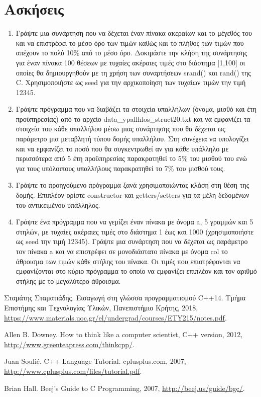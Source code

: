 \section{Ασκήσεις}
\begin{enumerate}
\item Γράψτε μια συνάρτηση που να δέχεται έναν πίνακα ακεραίων και το μέγεθός του και να επιστρέφει το μέσο όρο των τιμών καθώς και το πλήθος των τιμών που απέχουν το πολύ 10\% από το μέσο όρο. Δοκιμάστε την κλήση της συνάρτησης για έναν πίνακα 100 θέσεων με τυχαίες ακέραιες τιμές στο διάστημα [1,100] οι οποίες θα δημιουργηθούν με τη χρήση των συναρτήσεων srand() και rand() της C. Χρησιμοποιήστε ως seed για την αρχικοποίηση των τυχαίων τιμών την τιμή 12345.

\item Γράψτε πρόγραμμα που να διαβάζει τα στοιχεία υπαλλήλων (όνομα, μισθό και έτη προϋπηρεσίας) από το αρχείο data\_ypallhlos\_struct20.txt και να εμφανίζει τα στοιχεία του κάθε υπαλλήλου μέσω μιας συνάρτησης που θα δέχεται ως παράμετρο μια μεταβλητή τύπου δομής υπαλλήλου. Στη συνέχεια να υπολογίζει και να εμφανίζει το ποσό που θα συγκεντρωθεί αν για κάθε υπάλληλο με περισσότερα από 5 έτη προϋπηρεσίας παρακρατηθεί το 5\% του μισθού του ενώ για τους υπόλοιπους υπαλλήλους παρακρατηθεί το 7\% του μισθού τους.

\item Γράψτε το προηγούμενο πρόγραμμα ξανά χρησιμοποιώντας κλάση στη θέση της δομής. Επιπλέον ορίστε constructor και getters/setters για τα μέλη δεδομένων του αντικειμένου υπάλληλος.

\item Γράψτε ένα πρόγραμμα που να γεμίζει έναν πίνακα με όνομα a, 5 γραμμών και 5 στηλών, με τυχαίες ακέραιες τιμές στο διάστημα 1 έως και 1000 (χρησιμοποιήστε ως seed την τιμή 12345). Γράψτε μια συνάρτηση που να δέχεται ως παράμετρο τον πίνακα a και να επιστρέφει σε μονοδιάστατο πίνακα με όνομα col το άθροισμα των τιμών κάθε στήλης του πίνακα. Οι τιμές που επιστρέφονται να εμφανίζονται στο κύριο πρόγραμμα το οποίο να εμφανίζει επιπλέον και τον αριθμό στήλης με το μεγαλύτερο άθροισμα.
\end{enumerate}



\begin{thebibliography}{9}
Σταμάτης Σταματιάδης. Εισαγωγή στη γλώσσα προγραμματισμού C++14. Τμήμα Επιστήμης και Τεχνολογίας Υλικών, Πανεπιστήμιο Κρήτης, 2018, \href{https://www.materials.uoc.gr/el/undergrad/courses/ETY215/notes.pdf}{https://www.materials.uoc.gr/el/undergrad/courses/ETY215/notes.pdf}.

Allen B. Downey. How to think like a computer scientist, C++ version, 2012, \href{http://www.greenteapress.com/thinkcpp/}{http://www.greenteapress.com/thinkcpp/}. 

Juan Souli\'e. C++ Language Tutorial. cplusplus.com, 2007, \href{http://www.cplusplus.com/files/tutorial.pdf}{http://www.cplusplus.com/files/tutorial.pdf}.

Brian Hall. Beej's Guide to C Programming, 2007, \href{http://beej.us/guide/bgc/}{http://beej.us/guide/bgc/}.

\end{thebibliography}
